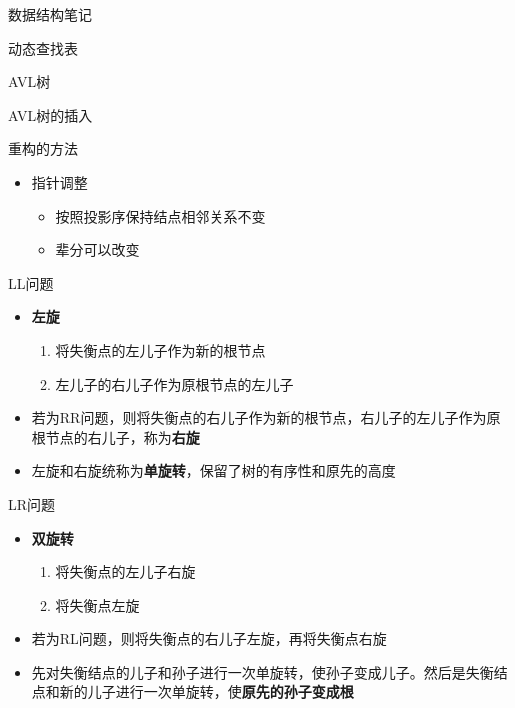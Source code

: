 \documentclass[
  ignorenonframetext,
]{beamer}
\providecommand{\tightlist}{%
  \setlength{\itemsep}{0pt}\setlength{\parskip}{0pt}}
\begin{document}
\begin{frame}[fragile]{数据结构笔记}
\begin{block}{动态查找表}
\begin{block}{AVL树}
\begin{block}{AVL树的插入}
\begin{block}{重构的方法}
\protect{}\label{ux91cdux6784ux7684ux65b9ux6cd5}
\begin{itemize}
\tightlist
\item
  指针调整

  \begin{itemize}
  \tightlist
  \item
    按照投影序保持结点相邻关系不变
  \item
    辈分可以改变
  \end{itemize}
\end{itemize}

\begin{block}{LL问题}
\protect{}\label{llux95eeux9898}

\begin{itemize}
\tightlist
\item
  \textbf{左旋}

  \begin{enumerate}
  \tightlist
  \item
    将失衡点的左儿子作为新的根节点
  \item
    左儿子的右儿子作为原根节点的左儿子
  \end{enumerate}
\item
  若为RR问题，则将失衡点的右儿子作为新的根节点，右儿子的左儿子作为原根节点的右儿子，称为\textbf{右旋}
\item
  左旋和右旋统称为\textbf{单旋转}，保留了树的有序性和原先的高度
\end{itemize}
\end{block}

\begin{block}{LR问题}
\protect{}\label{lrux95eeux9898}

\begin{itemize}
\tightlist
\item
  \textbf{双旋转}

  \begin{enumerate}
  \tightlist
  \item
    将失衡点的左儿子右旋
  \item
    将失衡点左旋
  \end{enumerate}
\item
  若为RL问题，则将失衡点的右儿子左旋，再将失衡点右旋
\item
  先对失衡结点的儿子和孙子进行一次单旋转，使孙子变成儿子。然后是失衡结点和新的儿子进行一次单旋转，使\textbf{原先的孙子变成根}
\end{itemize}
\end{block}
\end{block}


\end{block}
\end{block}
\end{block}
\end{frame}
\end{document}
